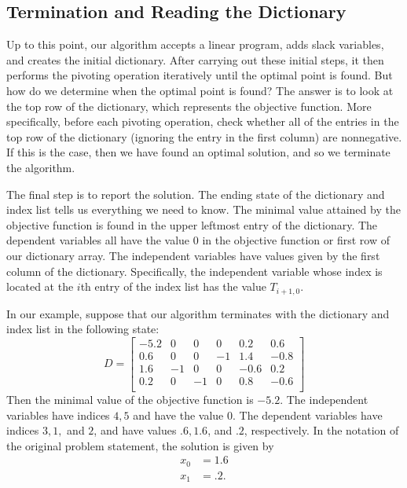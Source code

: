 \vspace{2mm}

\subsection{Termination and Reading the Dictionary} %

Up to this point, our algorithm accepts a linear program, adds slack variables, and creates the initial dictionary.
After carrying out these initial steps, it then performs the pivoting operation iteratively until the optimal point is found.
But how do we determine when the optimal point is found? The answer is to look at the top row of the dictionary, which represents the objective function.
More specifically, before each pivoting operation, check whether all of the entries in the top row of the dictionary (ignoring the entry in the first column) are nonnegative.
If this is the case, then we have found an optimal solution, and so we terminate the algorithm.

The final step is to report the solution.
The ending state of the dictionary and index list tells us everything we need to know.
The minimal value attained by the objective function is found in the upper leftmost entry of the dictionary.
The dependent variables all have the value $0$ in the objective function or first row of our dictionary array. The independent variables have values given by the first column of the dictionary.
Specifically, the independent variable whose index is located at the $i$th entry of the index list has the value $T_{i+1, 0}$.

In our example, suppose that our algorithm terminates with the dictionary and index list in the following state:
\[
D = \begin{bmatrix}
-5.2 & 0 & 0 & 0 & 0.2 & 0.6\\
0.6 & 0 & 0 & -1 & 1.4 & -0.8\\
1.6 & -1 & 0 & 0 & -0.6 & 0.2\\
0.2 & 0 & -1 & 0 & 0.8 & -0.6\\
\end{bmatrix}
\]
Then the minimal value of the objective function is $-5.2$.
The independent variables have indices $4, 5$ and have the value $0$.
The dependent variables have indices $3, 1,$ and $2$, and have values $.6, 1.6$, and $.2$, respectively.
In the notation of the original problem statement, the solution is given by
\begin{align*}
x_0 &= 1.6\\
x_1 &= .2.
\end{align*}

